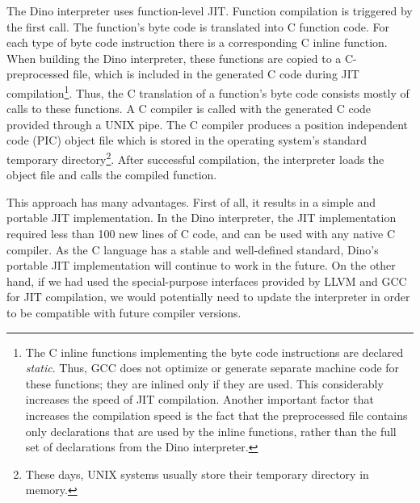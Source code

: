 \documentclass[preprint]{sigplanconf}
\begin{document}
  The Dino interpreter uses function-level JIT.  Function compilation is
triggered by the first call.  The function's byte code is translated
into C function code.
For each type of byte code instruction there is a corresponding
C inline function. When building the Dino interpreter, these functions
are copied to a C-preprocessed file, which is included in the generated C
code during JIT compilation\footnote{The C inline functions implementing the byte code instructions
are declared \emph{static}. Thus, GCC does not
  optimize or generate separate machine code for these functions;
  they are inlined only if they are used.
  This considerably increases the speed of JIT compilation.
  Another important factor that increases the compilation speed
  is the fact that the preprocessed file contains only declarations that
  are used by the inline functions, rather than the full set of declarations
  from the Dino interpreter.
}. Thus, the
C translation of a function's byte code consists mostly of calls to
these functions.
A C compiler is called with the generated C code provided through a UNIX pipe.  The
C compiler produces a position independent code (PIC) object file which is
stored in the operating system's standard temporary directory\footnote{These days, UNIX systems usually store their temporary directory in memory.}.
After successful compilation, the interpreter loads the
object file and calls the compiled function.

  This approach has many advantages.  First of all, it results in a
simple and portable JIT implementation.  In the Dino interpreter, the JIT implementation
required less than 100 new lines of C code, and can be used with any native C compiler.
As the C language has a stable and well-defined standard,
Dino's portable JIT implementation will continue to work in the future.
On the other hand, if we had used the special-purpose interfaces provided
by LLVM and GCC for JIT compilation, we would potentially need to update the interpreter 
in order to be compatible with future compiler versions.
\end{document}
